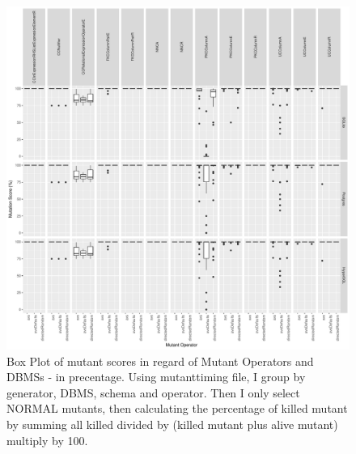 \documentclass[runningheads,a4paper]{llncs}
\begin{document}
\begin{figure}[htbp]
\centering
\includegraphics{../plots/figure10.pdf}
\caption{Box Plot of mutant scores in regard of Mutant Operators and
DBMSs - in precentage. Using mutanttiming file, I group by generator,
DBMS, schema and operator. Then I only select NORMAL mutants, then
calculating the percentage of killed mutant by summing all killed
divided by (killed mutant plus alive mutant) multiply by 100.}
\end{figure}

\hypertarget{refs}{}
\end{document}
